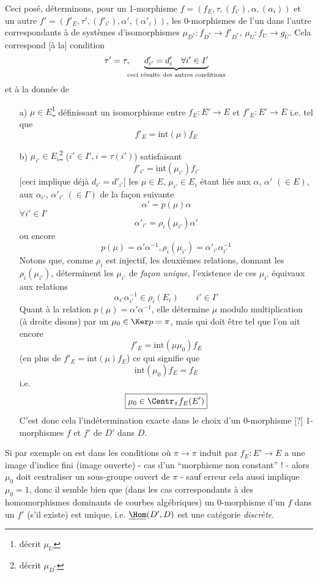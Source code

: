 Ceci posé, déterminons, pour un 1-morphisme $f = (f_E, \tau, (f_{i'}), \alpha, (\alpha_i))$ et un autre $f' = (f'_E, \tau', (f'_{i'}), \alpha', (\alpha'_i))$, les 0-morphismes de l'un dans l'autre correspondants à de systèmes d'isomorphismes $\mu_{D^*}: f_{D^*} \to f'_{D^*}$, $\mu_U: f_U \to g_U$. Cela correspond [à la] condition
$$
\tau' = \tau, \quad \underbrace{d'_{i'} = d'_i \quad \forall i' \in I'}_{\text{\hspace*{-5mm}ceci résulte des autres conditions\hspace*{-5mm}}}
$$
et à la donnée de
\begin{enumerate}
    \item[a)] $\boxed{\mu \in E}$\footnote{décrit $\mu_U$} définissant un isomorphisme entre $f_E: E' \to E$ et $f'_E: E' \to E$ i.e. tel que
    $$
    \boxed{f'_E = \text{int}(\mu)f_E}
    $$
    \item[b)] $\boxed{\mu_{i'} \in E_i}$\footnote{décrit $\mu_{D^*}$} ($i' \in  I', i = \tau(i')$)
    satisfaisant
    $$
    \boxed{f'_{i'} = \text{int}(\mu_{i'})f_{i'}}
    $$
    [ceci implique déjà $d_{i'} = d'_{i'}$] les $\mu \in E$, $\mu_{i'} \in E_i$ étant liés aux $\alpha$, $\alpha'$ $(\in E)$, aux $\alpha_{i'}$, $\alpha'_{i'}$ $(\in \Gamma)$ de la fa\c{c}on suivante
    $$
    \boxed{\alpha' = p(\mu) \alpha}
    $$
    $\forall i' \in I'$
    $$
    \boxed{\alpha'_{i'} = \rho_i(\mu_{i'})\alpha'}
    $$
    ou encore
    $$
    \boxed{p(\mu) = \alpha' \alpha^{-1}, \rho_i(\mu_{i'}) = \alpha'_{i'}\alpha^{-1}_{i'}}
    $$
    Notons que, comme $\rho_i$ est injectif, les deuxièmes relations, donnant les $\rho_i(\mu_{i'})$, déterminent les $\mu_{i'}$ de \emph{fa\c{c}on unique}, l'existence de ces $\mu_{i'}$ équivaux aux relations
    $$
    \boxed{\alpha_{i'} \alpha^{-1}_{i'} \in \rho_i(E_i)} \quad\quad i' \in I'
    $$
    Quant à la relation $p(\mu) = \alpha' \alpha^{-1}$, elle détermine $\mu$ modulo multiplication (à droite disons) par un $\mu_0 \in \Ker p = \pi$, mais qui doit être tel que l'on ait encore
    $$
    f'_E = \text{int}(\mu\mu_0)f_E
    $$
    (en plus de $f'_E = \text{int}(\mu)f_E$) ce qui signifie que
    $$
    \text{int}(\mu_0)f_E = f_E
    $$
    i.e.
    $$
    \boxed{\mu_0 \in \Centr_{\pi}f_E(E')}
    $$
    C'est donc cela l'indétermination exacte dans le choix d'un 0-morphisme [?] 1-morphismes $f$ et $f'$ de $D'$ dans $D$.
\end{enumerate}
Si par exemple on est dans les conditions où $\pi \to \pi$ induit par $f_E: E' \to E$ a une image d'indice fini (image ouverte) - cas d'un ``morphisme non constant'' ! - alors $\mu_0$ doit centraliser un sous-groupe ouvert de $\pi$ - sauf erreur cela aussi implique $\mu_0 = 1$, donc il semble bien que (dans les cas correspondants à des homomorphismes dominants de courbes algébriques) un $0$-morphisme d'un $f$ dans un $f'$ (s'il existe) est unique, i.e. $\underline{\Hom}(D', D)$ est une catégorie \emph{discrète}.

